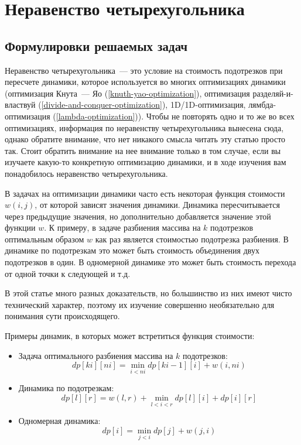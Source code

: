 \chapter{Неравенство четырехугольника} \label{quadrangle-inequality}

\section{Формулировки решаемых задач}

Неравенство четырехугольника~--- это условие на стоимость подотрезков при пересчете динамики, которое используется во многих оптимизациях динамики (оптимизация Кнута~--- Яо (\ref{knuth-yao-optimization}), оптимизация разделяй-и-властвуй (\ref{divide-and-conquer-optimization}), 1D/1D-оптимизация, лямбда-оптимизация (\ref{lambda-optimization})). Чтобы не повторять одно и то же во всех оптимизациях, информация по неравенству четырехугольника вынесена сюда, однако обратите внимание, что нет никакого смысла читать эту статью просто так. Стоит обратить внимание на нее внимание только в том случае, если вы изучаете какую-то конкретную оптимизацию динамики, и в ходе изучения вам понадобилось неравенство четырехугольника.

В задачах на оптимизации динамики часто есть некоторая функция стоимости $w(i, j)$, от которой зависят значения динамики. Динамика пересчитывается через предыдущие значения, но дополнительно добавляется значение этой функции $w$. К примеру, в задаче разбиения массива на $k$ подотрезков оптимальным образом $w$ как раз является стоимостью подотрезка разбиения. В динамике по подотрезкам это может быть стоимость объединения двух подотрезков в один. В одномерной динамике это может быть стоимость перехода от одной точки к следующей и т.д.

В этой статье много разных доказательств, но большинство из них имеют чисто технический характер, поэтому их изучение совершенно необязательно для понимания сути происходящего.

Примеры динамик, в которых может встретиться функция стоимости:

\begin{itemize}
    \item Задача оптимального разбиения массива на $k$ подотрезков:
        $$dp[ki][ni] = \min_{i < ni} dp[ki - 1][i] + w(i, ni)$$

    \item Динамика по подотрезкам:
        $$dp[l][r] = w(l, r) + \min_{l < i < r} dp[l][i] + dp[i][r]$$

    \item Одномерная динамика:
        $$dp[i] = \min_{j < i} dp[j] + w(j, i)$$
\end{itemize}


